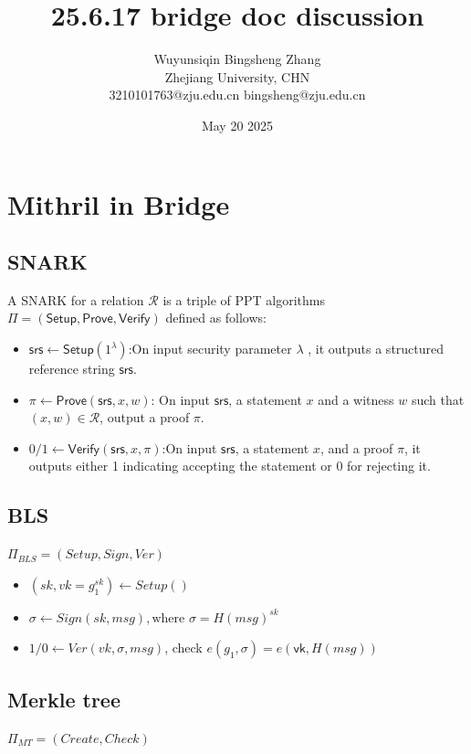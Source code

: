 \documentclass{article}
\title{25.6.17 bridge doc discussion}
\author{Wuyunsiqin \quad \quad Bingsheng Zhang \\ 
Zhejiang University, CHN \\
3210101763@zju.edu.cn \quad bingsheng@zju.edu.cn}
\date{May 20 2025}
\begin{document}
\maketitle

\section{Mithril in Bridge}

\subsection{SNARK}
A SNARK for a relation $\mathcal{R}$ is a triple of PPT algorithms $\Pi = (\mathsf{Setup}, \mathsf{Prove}, \mathsf{Verify})$ defined as follows:


\begin{itemize}
    \item $  \mathsf{srs} \leftarrow \mathsf{Setup}(1^\lambda)$:On input security parameter $\lambda$
, it outputs a structured reference string $\mathsf{srs}$.   
    \item $\pi \leftarrow \mathsf{Prove}(\mathsf{srs}, x, w)$: On input $\mathsf{srs}$, a statement $x$ and a witness $w$ such that $(x, w) \in \mathcal{R}$, output a proof $\pi$.
    \item $0/1 \leftarrow\mathsf{Verify}(\mathsf{srs},x,\pi) $:On input $\mathsf{srs}$, a statement $x$, and a
proof $\pi$, it outputs either 1 indicating accepting the statement or 0 for rejecting it.
\end{itemize}

\subsection{BLS}
$\Pi_{BLS} = (Setup,Sign,Ver)$
\begin{itemize}
    \item $(sk,vk = g_1^{sk}) \leftarrow Setup() $
    \item $\sigma \leftarrow Sign(sk,msg), \text{where  }\sigma = H(msg)^{sk}$
    \item $1/0 \leftarrow Ver(vk,\sigma,msg)$, check $e(g_1, \sigma) = e(\mathsf{vk}, H(msg))$
\end{itemize}

\subsection{Merkle tree}

$\Pi_{MT} = (Create,Check)$
\end{document}
